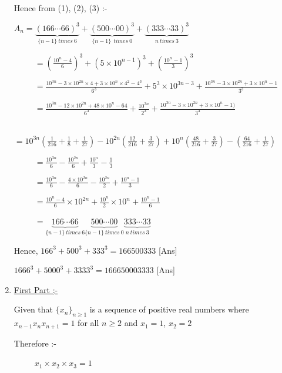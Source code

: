 \documentclass{article}
\begin{document}
\begin{enumerate}
Hence from (1), (2), (3) :-
\bigskip

    
$A_n = \underbrace {(166\cdots 66)^3}_{\{ n-1 \} \ times \ 6} + \underbrace{(500\cdots 00)^3}_{\{ n-1\} \ \ times \ 0} + \underbrace{(333\cdots 33 )^3}_{n \ times \ 3}$ 

\ \ \ \ \ $= \displaystyle {\left( \frac {10^n - 4}{6}\right )^3 + \left( 5\times 10^{n-1}\right )^3 + \left( \frac {10^n-1}{3}\right )^3}$

\ \ \ \ \ $= \displaystyle { \frac {10^{3n}-3\times 10^{2n}\times 4 + 3\times 10^n\times 4^2- 4^3}{6^3} +  5^3\times 10^{3n-3} +  \frac {10^{3n}-3\times 10^{2n}+ 3\times 10^n-1}{3^3}}$

\ \ \ \ \ $ = \displaystyle {\frac {10^{3n}-12\times10^{2n}+48\times10^n - 64}{6^3}+ \frac {10^{3n}}{2^3} +\frac{10^{3n}- 3\times 10^{2n}+ 3\times 10^n-1)}{3^3}}$

\ \ \ \ \ $= \displaystyle {10^{3n}\left(\frac{1}{216}+\frac{1}{8}+\frac{1}{27}\right)-10^{2n}\left(\frac{12}{216}+\frac{3}{27}\right)+10^n\left(\frac{48}{216}+\frac{3}{27}\right)-\left(\frac{64}{216}+\frac{1}{27}\right)}$

\ \ \ \ \ $=\displaystyle{\frac{10^{3n}}{6}-\frac{10^{2n}}{6}+\frac{10^n}{3}-\frac{1}{3}}$

\ \ \ \ \ $=\displaystyle{\frac{10^{3n}}{6}-\frac{4\times 10^{2n}}{6}-\frac{10^{2n}}{2}+\frac{10^n-1}{3}}$

\ \ \ \ \ $=\displaystyle{ \frac{10^{n}-4}{6}\times 10^{2n}+\frac{10^{n}}{2}\times10^n +\frac{10^n-1}{6}}$

\ \ \ \ \ $=\underbrace{166\cdots 66}_{\{ n-1\} \ times \ 6}\underbrace{500\cdots 00}_{\{ n-1\} \ times \ 0}\underbrace{333\cdots33}_{n \ times \ 3}$
\bigskip

Hence, $ 166^3 + 500^3 + 333^3 = 166500333$ [Ans]

$1666^3 + 5000^3 + 3333^3 = 166650003333$ [Ans]
\bigskip

\bigskip

\bigskip

\bigskip

\bigskip

\item \underline{First Part ;-}

Given that $\{x_n \}_{n\geq 1}$ is a sequence of positive real numbers where $x_{n-1}x_nx_{n+1}=1$ for all $n\geq 2$ and $x_1=1$, $x_2=2$
 
 Therefore :-
 
 \ \ \ \ \ $x_1\times x_2 \times x_3=1$
 

\end{enumerate}
\end{document}
